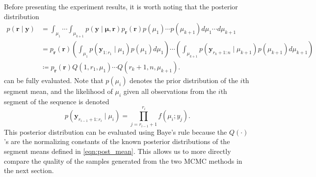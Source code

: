 Before presenting the experiment results, it is worth noting that the posterior distribution 
\begin{align*}
p(\bm{r} \mid \bm{y}) &= \int_{\mu_1}\cdots\int_{\mu_{k+1}} p(\bm{y} \mid \bm{\mu}, \bm{r}) p_{\bm{r}}(\bm{r}) p(\mu_1)\cdots p(\mu_{k+1}) d\mu_1\cdots d\mu_{k+1}\\
&= p_{\bm{r}}(\bm{r})\left(\int_{\mu_1}p(\bm{y}_{1 : r_1} \mid \mu_1) p(\mu_1) d\mu_1\right)\cdots\left(\int_{\mu_{k+1}}p(\bm{y}_{r_k+1 : n} \mid \mu_{k+1}) p(\mu_{k+1}) d\mu_{k+1}\right)\\
&\coloneqq p_{\bm{r}}(\bm{r})Q(1,r_1,\mu_1)\cdots Q(r_{k}+1,n,\mu_{k+1}).
\end{align*}
can be fully evaluated. Note that $p(\mu_i)$ denotes the prior distribution of the $i$th segment mean, and the likelihood of $\mu_i$ given all observations from the $i$th segment of the sequence is denoted
\[
p(\bm{y}_{r_{i-1}+1:r_i} \mid \mu_i) = \prod_{j=r_{i-1}+1}^{r_i} f(\mu_i ; y_j).
\]
This posterior distribution can be evaluated using Baye's rule because the $Q(\cdot)$'s are the normalizing constants of the known posterior distributions of the segment means defined in \cref{eqn:post_mean}. This allows us to more directly compare the quality of the samples generated from the two MCMC methods in the next section.
